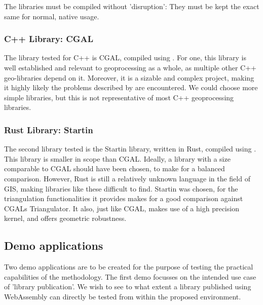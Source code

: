 The libraries must be compiled without 'disruption': They must be kept the exact same for normal, native usage. 

\subsubsection{C++ Library: CGAL} 
The library tested for C++ is CGAL, compiled using . 
For one, this library is well established and relevant to geoprocessing as a whole, as multiple other C++ geo-libraries depend on it.
Moreover, it is a sizable and complex project, making it highly likely the problems described by  are encountered. 
We could choose more simple libraries, but this is not representative of most C++ geoprocessing libraries. 


\subsubsection{Rust Library: Startin}
The second library tested is the Startin library, written in Rust, compiled using .  
This library is smaller in scope than CGAL. 
Ideally, a library with a size comparable to CGAL should have been chosen, to make for a balanced comparison. 
However, Rust is still a relatively unknown language in the field of GIS, making libraries like these difficult to find. 
Startin was chosen, for the triangulation functionalities it provides makes for a good comparison against CGALs Triangulator. 
It also, just like CGAL, makes use of a high precision kernel, and offers geometric robustness. 

\subsection{Demo applications}

Two demo applications are to be created for the purpose of testing the practical capabilities of the methodology. 
The first demo focusses on the intended use case of 'library publication'. 
We wish to see to what extent a library published using WebAssembly can directly be tested from within the proposed environment. 

